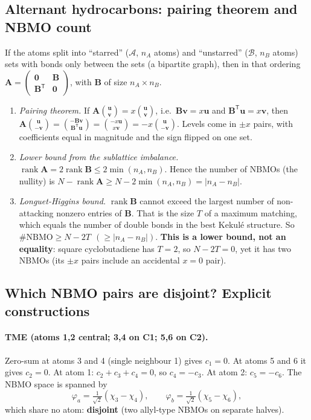 \subsection{Alternant hydrocarbons: pairing theorem and NBMO count}
If the atoms split into ``starred'' ($\mathcal A$, $n_A$ atoms) and ``unstarred'' ($\mathcal B$, $n_B$ atoms) sets with
bonds only between the sets (a bipartite graph), then in that ordering
$\mathbf A=\begin{pmatrix}\mathbf0&\mathbf B\\\mathbf B^{\mathsf T}&\mathbf0\end{pmatrix}$, with $\mathbf B$ of size $n_A\times n_B$.
\begin{enumerate}
  \item \emph{Pairing theorem.} If $\mathbf A\binom{\mathbf u}{\mathbf v}=x\binom{\mathbf u}{\mathbf v}$, i.e.\
        $\mathbf B\mathbf v=x\mathbf u$ and $\mathbf B^{\mathsf T}\mathbf u=x\mathbf v$, then
        $\mathbf A\binom{\mathbf u}{-\mathbf v}=\binom{-\mathbf B\mathbf v}{\mathbf B^{\mathsf T}\mathbf u}=\binom{-x\mathbf u}{x\mathbf v}=-x\binom{\mathbf u}{-\mathbf v}$.
        Levels come in $\pm x$ pairs, with coefficients equal in magnitude and the sign flipped on one set.
  \item \emph{Lower bound from the sublattice imbalance.} $\operatorname{rank}\mathbf A=2\operatorname{rank}\mathbf B\le2\min(n_A,n_B)$.
        Hence the number of NBMOs (the nullity) is $N-\operatorname{rank}\mathbf A\ge N-2\min(n_A,n_B)=|n_A-n_B|$.
  \item \emph{Longuet-Higgins bound.} $\operatorname{rank}\mathbf B$ cannot exceed the largest number of
        non-attacking nonzero entries of $\mathbf B$. That is the size $T$ of a maximum matching, which equals
        the number of double bonds in the best Kekulé structure. So $\#\text{NBMO}\ge N-2T\ \ (\ge|n_A-n_B|)$.
        \textbf{This is a lower bound, not an equality}: square cyclobutadiene has $T=2$, so $N-2T=0$,
        yet it has two NBMOs (its $\pm x$ pairs include an accidental $x=0$ pair).
\end{enumerate}

\subsection{Which NBMO pairs are disjoint? Explicit constructions}
\paragraph{TME (atoms 1,2 central; 3,4 on C1; 5,6 on C2).} Zero-sum at atoms 3 and 4 (single neighbour 1)
gives $c_1=0$. At atoms 5 and 6 it gives $c_2=0$. At atom 1: $c_2+c_3+c_4=0$, so $c_4=-c_3$. At atom 2:
$c_5=-c_6$. The NBMO space is spanned by
\begin{equation}
  \varphi_a=\tfrac1{\sqrt2}(\chi_3-\chi_4),\qquad\varphi_b=\tfrac1{\sqrt2}(\chi_5-\chi_6),
\end{equation}
which share no atom: \textbf{disjoint} (two allyl-type NBMOs on separate halves).

